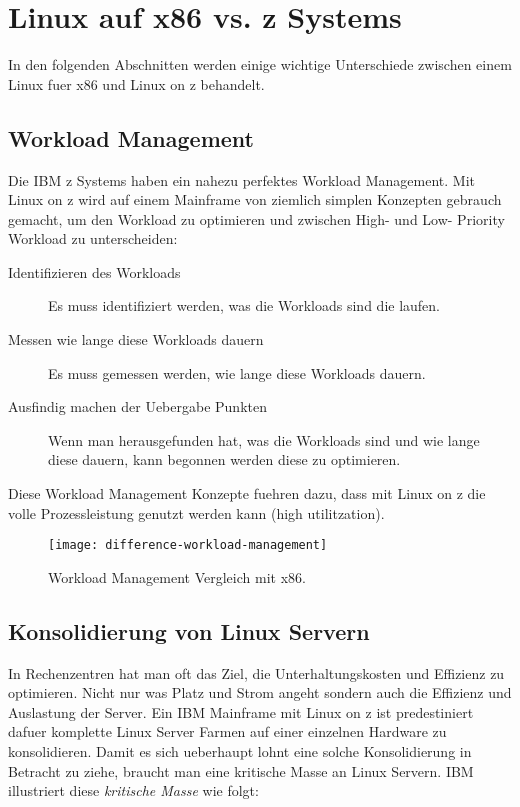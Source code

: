 \chapter{Linux auf x86 vs. z Systems}
\label{cha:Unterschiede}

In den folgenden Abschnitten werden einige wichtige Unterschiede zwischen einem Linux fuer x86 und Linux on z behandelt.

\section{Workload Management}

Die IBM z Systems haben ein nahezu perfektes Workload Management.
Mit Linux on z wird auf einem Mainframe von ziemlich simplen Konzepten gebrauch gemacht, um den Workload zu optimieren
und zwischen High- und Low- Priority Workload zu unterscheiden:

\begin{description}
    \item[Identifizieren des Workloads]{Es muss identifiziert werden, was die Workloads sind die laufen.}
    \item[Messen wie lange diese Workloads dauern]{Es muss gemessen werden, wie lange diese Workloads dauern.}
    \item[Ausfindig machen der Uebergabe Punkten]{Wenn man herausgefunden hat, was die Workloads sind und wie lange diese dauern, kann begonnen werden diese zu optimieren.}
\end{description}

\newpage
Diese Workload Management Konzepte fuehren dazu, dass mit Linux on z die volle Prozessleistung genutzt werden kann (high utilitzation).

\begin{figure}[h!]
\centering
\texttt{[image: difference-workload-management]}
\caption{Workload Management Vergleich mit x86\cite{WorkloadManagement}.}
\label{fig:WorkloadManagement}
\end{figure}

\section{Konsolidierung von Linux Servern}

In Rechenzentren hat man oft das Ziel, die Unterhaltungskosten und Effizienz zu optimieren.
Nicht nur was Platz und Strom angeht sondern auch die Effizienz und Auslastung der Server.
Ein IBM Mainframe mit Linux on z ist predestiniert dafuer komplette Linux Server Farmen auf einer
einzelnen Hardware zu konsolidieren.
Damit es sich ueberhaupt lohnt eine solche Konsolidierung in Betracht zu ziehe, braucht man eine kritische Masse
an Linux Servern. IBM illustriert diese \textit{kritische Masse} wie folgt:

